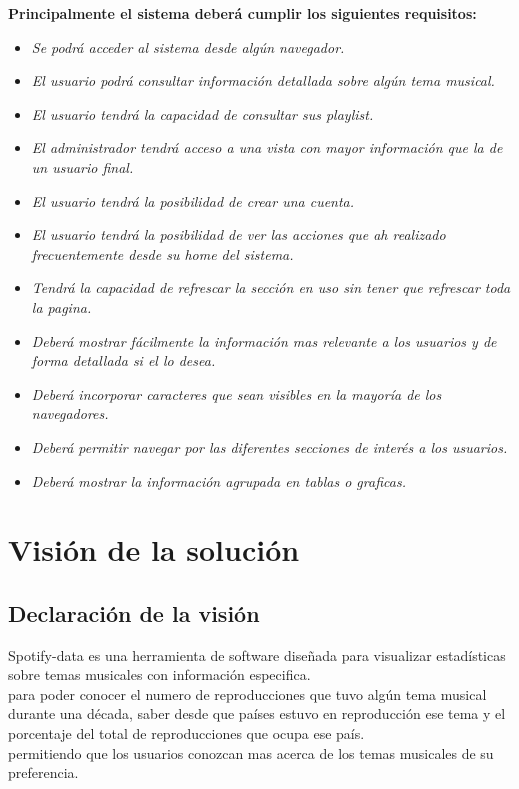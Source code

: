 \documentclass[12pt,a4paper]{book}
\begin{document}
\textbf{Principalmente el sistema deberá cumplir los siguientes requisitos: }
\vspace{0.5 cm}
\begin{itemize}
\item \textit{Se podrá acceder al sistema desde algún navegador.}
\item \textit{El usuario podrá consultar información detallada sobre algún tema musical.}
\item \textit{El usuario tendrá la capacidad de consultar sus playlist.}
\item \textit{El administrador tendrá acceso a una vista con mayor información que la de un usuario final.}
\item \textit{El usuario tendrá la posibilidad de crear una cuenta.}
\item \textit{El usuario tendrá la posibilidad de ver las acciones que ah realizado frecuentemente desde su home del sistema.}
\item \textit{Tendrá la capacidad de refrescar la sección en uso sin tener que refrescar toda la pagina.}
\item \textit{Deberá mostrar fácilmente la información mas relevante a los usuarios y de forma detallada si el lo desea.}
\item \textit{Deberá incorporar caracteres que sean visibles en la mayoría de los navegadores.}
\item \textit{Deberá permitir navegar por las diferentes secciones de interés a los usuarios.}
\item \textit{Deberá mostrar la información agrupada en tablas o graficas.}
\end{itemize}

\chapter{Visión de la solución}

\section{Declaración de la visión}
\vspace{0.5 cm}
Spotify-data es una herramienta de software diseñada para visualizar estadísticas sobre temas musicales con información especifica.\\ 
para poder conocer el numero de reproducciones que tuvo algún tema musical durante una década, saber desde que países estuvo en reproducción ese tema y el porcentaje del total de reproducciones que ocupa ese país.\\ permitiendo que los usuarios conozcan mas acerca de los temas musicales de su preferencia.
\end{document}

